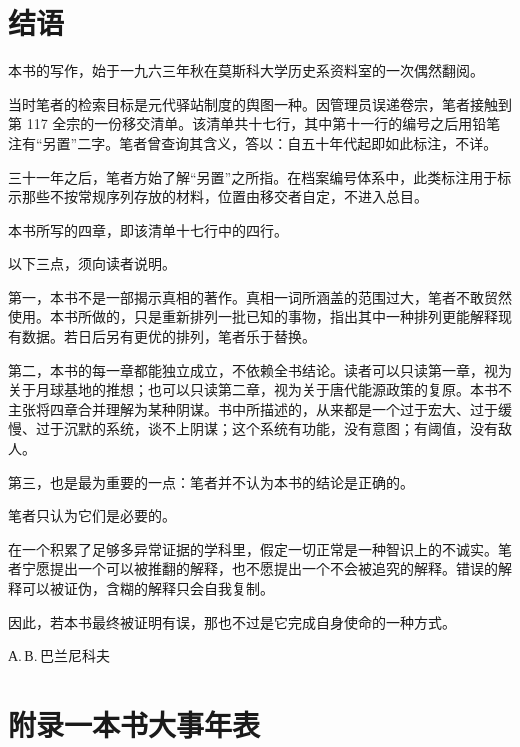 \clearpage
\chapter*{结\quad 语}
\vspace*{-10mm}

本书的写作，始于一九六三年秋在莫斯科大学历史系资料室的一次偶然翻阅。

当时笔者的检索目标是元代驿站制度的舆图一种。因管理员误递卷宗，笔者接触到第 117 全宗的一份移交清单。该清单共十七行，其中第十一行的编号之后用铅笔注有“另置”二字。笔者曾查询其含义，答以：自五十年代起即如此标注，不详。

三十一年之后，笔者方始了解“另置”之所指。在档案编号体系中，此类标注用于标示那些不按常规序列存放的材料，位置由移交者自定，不进入总目。

本书所写的四章，即该清单十七行中的四行。

以下三点，须向读者说明。

第一，本书不是一部揭示真相的著作。真相一词所涵盖的范围过大，笔者不敢贸然使用。本书所做的，只是重新排列一批已知的事物，指出其中一种排列更能解释现有数据。若日后另有更优的排列，笔者乐于替换。

第二，本书的每一章都能独立成立，不依赖全书结论。读者可以只读第一章，视为关于月球基地的推想；也可以只读第二章，视为关于唐代能源政策的复原。本书不主张将四章合并理解为某种阴谋。书中所描述的，从来都是一个过于宏大、过于缓慢、过于沉默的系统，谈不上阴谋；这个系统有功能，没有意图；有阈值，没有敌人。

第三，也是最为重要的一点：笔者并不认为本书的结论是正确的。

笔者只认为它们是必要的。

在一个积累了足够多异常证据的学科里，假定一切正常是一种智识上的不诚实。笔者宁愿提出一个可以被推翻的解释，也不愿提出一个不会被追究的解释。错误的解释可以被证伪，含糊的解释只会自我复制。

因此，若本书最终被证明有误，那也不过是它完成自身使命的一种方式。
\begin{flushright}
{\small А.\,В.\,巴兰尼科夫}
\end{flushright}

\clearpage
\chapter*{附录一\quad 本书大事年表}

